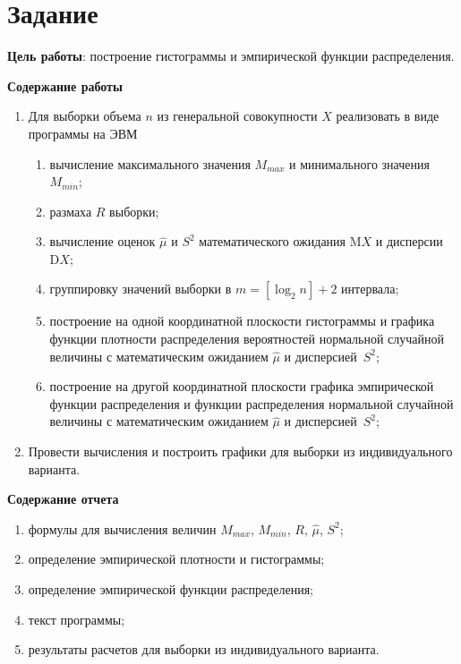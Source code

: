 \chapter{Задание}

\textbf{Цель работы}: построение гистограммы и эмпирической функции
распределения.

\textbf{Содержание работы}

\begin{enumerate}
    \item Для выборки объема $n$ из генеральной совокупности $X$ реализовать в
        виде программы на ЭВМ
        \begin{enumerate}[label=\asbuk*)]
            \item вычисление максимального значения $M_{max}$ и минимального
                значения $M_{min}$;
            \item размаха $R$ выборки;
            \item вычисление оценок $\hat{\mu}$ и $S^2$ математического ожидания
                $\mathrm{M}X$ и дисперсии $\mathrm{D}X$;
            \item группировку значений выборки в $m = [\log_2 n] + 2$ интервала;
            \item построение на одной координатной плоскости гистограммы и
                графика функции плотности распределения вероятностей нормальной
                случайной величины с математическим ожиданием $\hat{\mu}$ и
                дисперсией~$S^2$;
            \item построение на другой координатной плоскости графика
                эмпирической функции распределения и функции распределения
                нормальной случайной величины с математическим ожиданием
                $\hat{\mu}$ и дисперсией~$S^2$;
        \end{enumerate}
    \item Провести вычисления и построить графики для выборки из индивидуального
        варианта.
\end{enumerate}

\textbf{Содержание отчета}

\begin{enumerate}
    \item формулы для вычисления величин $M_{max}$, $M_{min}$, $R$, $\hat{\mu}$, $S^2$;
    \item определение эмпирической плотности и гистограммы;
    \item определение эмпирической функции распределения;
    \item текст программы;
    \item результаты расчетов для выборки из индивидуального варианта.
\end{enumerate}
